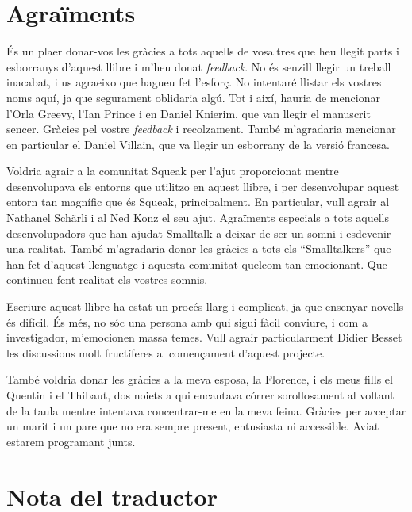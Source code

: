 \chapter{Agraïments}

\noindent
És un plaer donar-vos les gràcies a tots aquells de vosaltres que heu llegit parts i esborranys d'aquest llibre i m'heu donat \emph{feedback}. No és senzill llegir un treball inacabat,  i us agraeixo que hagueu fet l'esforç. No intentaré llistar els vostres noms aquí, ja que segurament oblidaria algú. Tot i així, hauria de mencionar l'Orla Greevy, l'Ian Prince i en Daniel Knierim, que van llegir el manuscrit sencer. Gràcies pel vostre \emph{feedback} i recolzament. També m'agradaria mencionar en particular el Daniel Villain, que va llegir un esborrany de la versió francesa.

\vspace{5mm}
\noindent
Voldria agrair a la comunitat Squeak per l'ajut proporcionat mentre desenvolupava els entorns que utilitzo en aquest llibre, i per desenvolupar aquest entorn tan magnífic que és Squeak, principalment. En particular, vull agrair al Nathanel Schärli i al Ned Konz el seu ajut. Agraïments especials a tots aquells desenvolupadors que han ajudat Smalltalk a deixar de ser un somni i esdevenir una realitat. També m'agradaria donar les gràcies a tots els ``Smalltalkers'' que han fet d'aquest llenguatge i aquesta comunitat quelcom tan emocionant. Que continueu fent realitat els vostres somnis.

\vspace{5mm}
\noindent
Escriure aquest llibre ha estat un procés llarg i complicat, ja que ensenyar novells és difícil. És més, no sóc una persona amb qui sigui fàcil conviure, i com a investigador, m'emocionen massa temes. Vull agrair particularment Didier Besset les discussions molt fructíferes al començament d'aquest projecte.

\vspace{5mm}
\noindent
També voldria donar les gràcies a la meva esposa, la Florence, i els meus fills el Quentin i el Thibaut, dos noiets a qui encantava córrer sorollosament al voltant de la taula mentre intentava concentrar-me en la meva feina. Gràcies per acceptar un marit i un pare que no era sempre present, entusiasta ni accessible. Aviat estarem programant junts.

\chapter{Nota del traductor}

